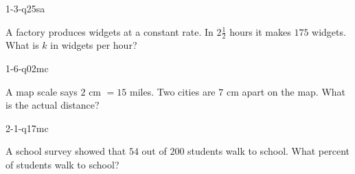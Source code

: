 
\begin{practiceQuestion}{1-3-q25}{sa}
\begin{questionText}
A factory produces widgets at a constant rate. In $2\frac{1}{2}$ hours it makes $175$ widgets. What is $k$ in widgets per hour?
\end{questionText}
\end{practiceQuestion}

\begin{practiceQuestion}{1-6-q02}{mc}
\begin{questionText}
A map scale says $2$ cm $= 15$ miles. Two cities are $7$ cm apart on the map. What is the actual distance?
\end{questionText}
\end{practiceQuestion}

\begin{practiceQuestion}{2-1-q17}{mc}
\begin{questionText}
A school survey showed that $54$ out of $200$ students walk to school. What percent of students walk to school?
\end{questionText}
\end{practiceQuestion}

